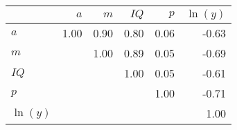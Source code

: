 \begin{tabular}{lrrrrr}
\hline
 & $a$  & $m$  & $IQ$  & $p$  & $\ln(y)$  \\
\hline
$a$ & 1.00  & 0.90  & 0.80  & 0.06  & -0.63  \\
$m$ &   & 1.00  & 0.89  & 0.05  & -0.69  \\
$IQ$ &   &   & 1.00  & 0.05  & -0.61  \\
$p$ &   &   &   & 1.00  & -0.71  \\
$\ln(y)$ &   &   &   &   & 1.00  \\
\hline
\end{tabular}%
